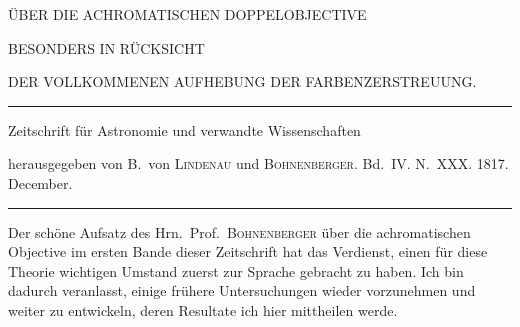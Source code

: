 \clearpage
{}
\begin{center}
{\Large ÜBER DIE ACHROMATISCHEN DOPPELOBJECTIVE\par}
\vspace{6mm}
{\large BESONDERS IN RÜCKSICHT\par}
\vspace{4mm}
{\large DER VOLLKOMMENEN AUFHEBUNG DER FARBENZERSTREUUNG.\par}
\vspace{7mm}\hrule\vspace{2mm}
Zeitschrift für Astronomie und verwandte Wissenschaften\par
herausgegeben von B.\ von \textsc{Lindenau} und \textsc{Bohnenberger}. Bd.\ IV. N.\ XXX. 1817. December.
\vspace{2mm}\hrule\vspace{5mm}
\end{center}
Der schöne Aufsatz des Hrn.\ Prof.\ \textsc{Bohnenberger} über die achromatischen Objective im ersten Bande dieser Zeitschrift hat das Verdienst, einen für diese Theorie wichtigen Umstand zuerst zur Sprache gebracht zu haben. Ich bin dadurch veranlasst, einige frühere Untersuchungen wieder vorzunehmen und weiter zu entwickeln, deren Resultate ich hier mittheilen werde.

